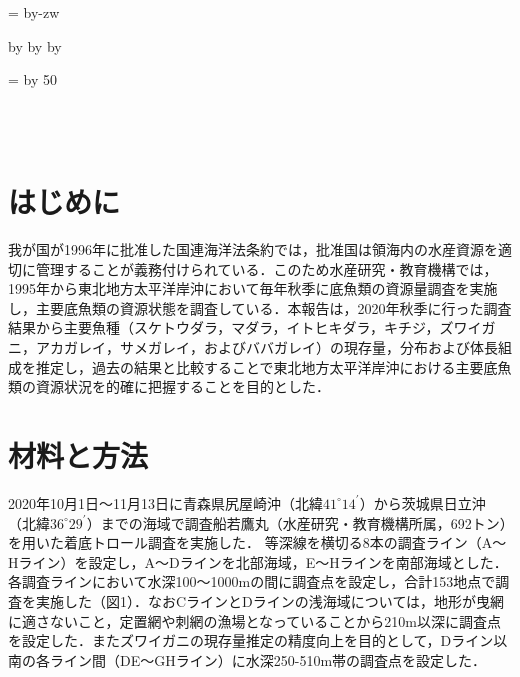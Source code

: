 \documentclass[11pt]{article} %
\makeatletter
\def\mojiparline#1{
\newcounter{mpl}
\setcounter{mpl}{#1}
\@tempdima=\linewidth
\advance\@tempdima by-\value{mpl}zw
\addtocounter{mpl}{-1}
\divide\@tempdima by \value{mpl}
\advance\kanjiskip by\@tempdima
\advance\parindent by\@tempdima
}
\def\linesparpage#1{
\baselineskip=\textheight
\divide\baselineskip by #1
}
\makeatother
\begin{document}

\mojiparline{40} %
\linesparpage{50} %


\\
\\

\begin{linenumbers}
\section{はじめに}
我が国が1996年に批准した国連海洋法条約では，批准国は領海内の水産資源を適切に管理することが義務付けられている．このため水産研究・教育機構では，1995年から東北地方太平洋岸沖において毎年秋季に底魚類の資源量調査を実施し，主要底魚類の資源状態を調査している．本報告は，2020年秋季に行った調査結果から主要魚種（スケトウダラ，マダラ，イトヒキダラ，キチジ，ズワイガニ，アカガレイ，サメガレイ，およびババガレイ）の現存量，分布および体長組成を推定し，過去の結果と比較することで東北地方太平洋岸沖における主要底魚類の資源状況を的確に把握することを目的とした．

\section{材料と方法}
2020年10月1日～11月13日に青森県尻屋崎沖（北緯$\textrm{41}^\circ \textrm{14}^\prime$）から茨城県日立沖（北緯$\textrm{36}^\circ \textrm{29}^\prime$）までの海域で調査船若鷹丸（水産研究・教育機構所属，692トン）を用いた着底トロール調査を実施した．
等深線を横切る8本の調査ライン（A～Hライン）を設定し，A～Dラインを北部海域，E～Hラインを南部海域とした．各調査ラインにおいて水深100～1000mの間に調査点を設定し，合計153地点で調査を実施した（図1）．なおCラインとDラインの浅海域については，地形が曳網に適さないこと，定置網や刺網の漁場となっていることから210m以深に調査点を設定した．またズワイガニの現存量推定の精度向上を目的として，Dライン以南の各ライン間（DE〜GHライン）に水深250-510m帯の調査点を設定した．


\end{linenumbers}
\end{document}
